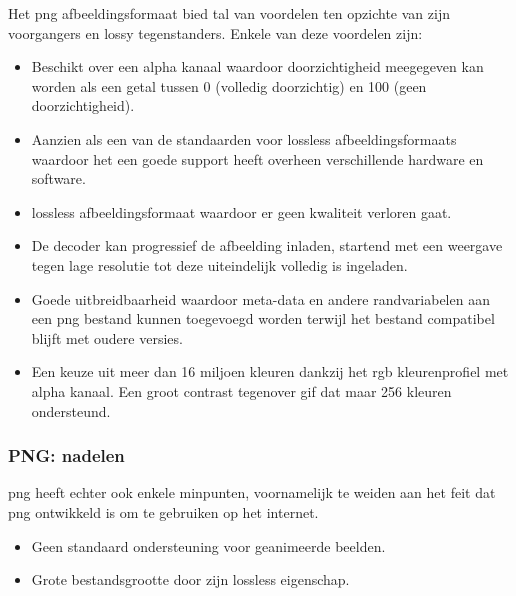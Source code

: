 Het \gls{png} \gls{afbeeldingsformaat} bied tal van voordelen ten opzichte van zijn voorgangers en \gls{lossy} tegenstanders. Enkele van deze voordelen zijn:

\begin{itemize}
	\item Beschikt over een alpha kanaal waardoor doorzichtigheid meegegeven kan worden als een getal tussen 0 (volledig doorzichtig) en 100 (geen doorzichtigheid).
	
	\item Aanzien als een van de standaarden voor \gls{lossless} \glspl{afbeeldingsformaat} waardoor het een goede support heeft overheen verschillende hardware en software.
	
	\item \Gls{lossless} \gls{afbeeldingsformaat} waardoor er geen kwaliteit verloren gaat.
	
	\item De  \gls{decoder} kan progressief de afbeelding inladen, startend met een weergave tegen lage resolutie tot deze uiteindelijk volledig is ingeladen.
	
	\item Goede uitbreidbaarheid waardoor \gls{meta-data} en andere randvariabelen aan een \gls{png} bestand kunnen toegevoegd worden terwijl het bestand compatibel blijft met oudere versies.
	
	\item Een keuze uit meer dan 16 miljoen kleuren dankzij het \gls{rgb} kleurenprofiel met alpha kanaal. Een groot contrast tegenover \gls{gif} dat maar 256 kleuren ondersteund. 
\end{itemize}

\subsubsection{PNG: nadelen}
\label{sec:afbeeldingscompressie-png-nadelen}

\Gls{png} heeft echter ook enkele minpunten, voornamelijk te weiden aan het feit dat \gls{png} ontwikkeld is om te gebruiken op het internet.

\begin{itemize}
	\item Geen standaard ondersteuning voor geanimeerde beelden.
	
	\item Grote bestandsgrootte door zijn \gls{lossless} eigenschap.
\end{itemize}


